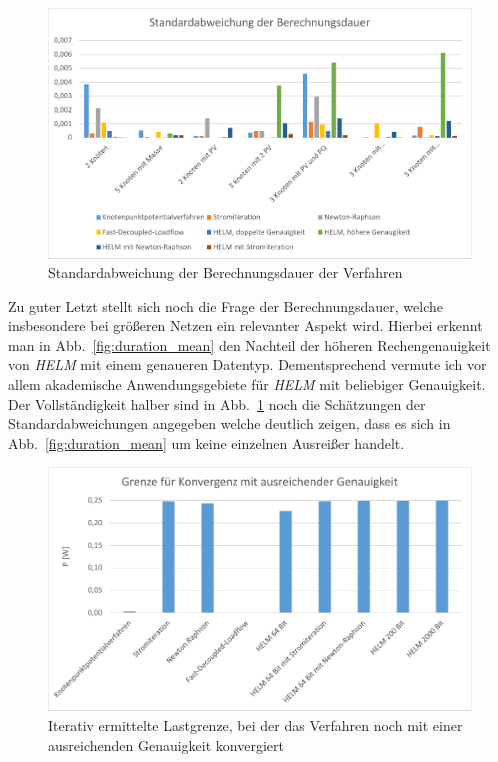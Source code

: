 \documentclass[12pt,a4paper]{article}
\newcommand{\reffig}[1]{{Abb.~\ref{#1}}}
\begin{document}
	\begin{figure}
		\centering
		\includegraphics[scale=0.8]{pictures/duration_deviation}
		\caption{Standardabweichung der Berechnungsdauer der Verfahren}
		\label{fig:duration_deviation}
	\end{figure}
	
	Zu guter Letzt stellt sich noch die Frage der Berechnungsdauer, welche insbesondere bei größeren Netzen ein relevanter Aspekt wird. Hierbei erkennt man in \reffig{fig:duration_mean} den Nachteil der höheren Rechengenauigkeit von \emph{HELM} mit einem genaueren Datentyp. Dementsprechend vermute ich vor allem akademische Anwendungsgebiete für \emph{HELM} mit beliebiger Genauigkeit. Der Vollständigkeit halber sind in \reffig{fig:duration_deviation} noch die Schätzungen der Standardabweichungen angegeben welche deutlich zeigen, dass es sich in \reffig{fig:duration_mean} um keine einzelnen Ausreißer handelt.
	
	\begin{figure}
		\centering
		\includegraphics[scale=0.8]{pictures/convergence_border_1}
		\caption{Iterativ ermittelte Lastgrenze, bei der das Verfahren noch mit einer ausreichenden Genauigkeit konvergiert}
		\label{fig:convergence_border_1}
	\end{figure}
	
\end{document}
